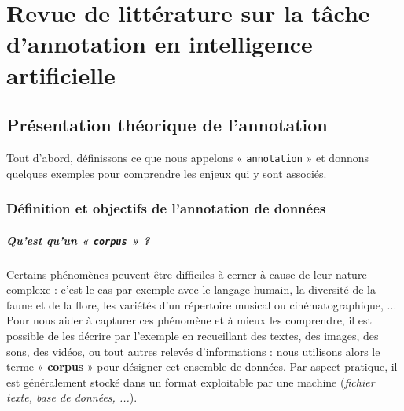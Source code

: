 \chapter{Revue de littérature sur la tâche d'annotation en intelligence artificielle}
\label{chapter:2-REVUE-DE-LITTERATURE}
	
	
	
    \minitoc
	
    \section{Présentation théorique de l'annotation}
	\label{section:2.1-PRESENTATION-ANNOTATION}
	
		Tout d'abord, définissons ce que nous appelons « \texttt{annotation} » et donnons quelques exemples pour comprendre les enjeux qui y sont associés.
		
		
		\subsection{Définition et objectifs de l'annotation de données}
		\label{section:2.1.1-PRESENTATION-ANNOTATION-DEFINITION}
			
			\paragraph{Qu'est qu'un « \texttt{corpus} » ?}
			Certains phénomènes peuvent être difficiles à cerner à cause de leur nature complexe : c'est le cas par exemple avec le langage humain, la diversité de la faune et de la flore, les variétés d'un répertoire musical ou cinématographique, ...
			Pour nous aider à capturer ces phénomène et à mieux les comprendre, il est possible de les décrire par l'exemple en recueillant des textes, des images, des sons, des vidéos, ou tout autres relevés d'informations : nous utilisons alors le terme « \textbf{corpus} » pour désigner cet ensemble de données.
			Par aspect pratique, il est généralement stocké dans un format exploitable par une machine (\textit{fichier texte, base de données, ...}).
			
